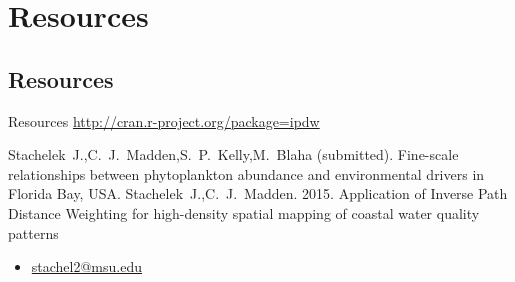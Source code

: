 \documentclass[compress,noflama,nosectionpages]{beamer}
\begin{document}
\section{Resources}
\subsection{Resources}
\begin{frame}{Resources}
  \centering
  \url{http://cran.r-project.org/package=ipdw}
  \begin{thebibliography}{10}
  \beamertemplatearticlebibitems
	Stachelek~J.,C.~J.~Madden,S.~P.~Kelly,M.~Blaha (submitted). Fine-scale relationships between phytoplankton abundance and environmental drivers in Florida Bay, USA.
	\newblock {}
	Stachelek~J.,C.~J.~Madden. 2015. Application of Inverse Path Distance Weighting for high-density spatial mapping of coastal water quality patterns
	\newblock {}
  \end{thebibliography}

	\begin{itemize}
		\item \url{stachel2@msu.edu}
	\end{itemize}
\end{frame}
\end{document}
